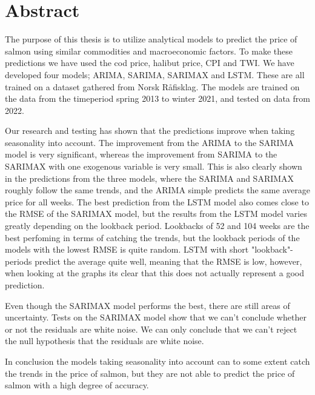 \section*{Abstract}
The purpose of this thesis is to utilize analytical models to predict the price of salmon using similar commodities and macroeconomic factors. To make these predictions we have used the cod price, halibut price, CPI and TWI. We have developed four models; ARIMA, SARIMA, SARIMAX and LSTM. These are all trained on a dataset gathered from Norsk Råfisklag. The models are trained on the data from the timeperiod spring 2013 to winter 2021, and tested on data from 2022. 

Our research and testing has shown that the predictions improve when taking seasonality into account. The improvement from the ARIMA to the SARIMA model is very significant, whereas the improvement from SARIMA to the SARIMAX with one exogenous variable is very small. This is also clearly shown in the predictions from the three models, where the SARIMA and SARIMAX roughly follow the same trends, and the ARIMA simple predicts the same average price for all weeks. The best prediction from the LSTM model also comes close to the RMSE of the SARIMAX model, but the results from the LSTM model varies greatly depending on the lookback period. Lookbacks of 52 and 104 weeks are the best perfoming in terms of catching the trends, but the lookback periods of the models with the lowest RMSE is quite random. LSTM with short "lookback"-periods predict the average quite well, meaning that the RMSE is low, however, when looking at the graphs its clear that this does not actually represent a good prediction. 

Even though the SARIMAX model performs the best, there are still areas of uncertainty. Tests on the SARIMAX model show that we can't conclude whether or not the residuals are white noise. We can only conclude that we can't reject the null hypothesis that the residuals are white noise.  

In conclusion the models taking seasonality into account can to some extent catch the trends in the price of salmon, but they are not able to predict the price of salmon with a high degree of accuracy. 